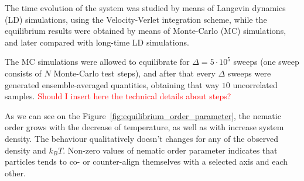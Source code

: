 \documentclass[12pt, a4paper]{article}
\newcommand{\figref}[1]{Figure~\ref{#1}}
\begin{document}
The time evolution of the system was studied by means of Langevin dynamics (LD) simulations, using the Velocity-Verlet integration scheme, while the equilibrium results were obtained by means of Monte-Carlo (MC) simulations, and later compared with long-time LD simulations.

The MC simulations were allowed to equilibrate for $\Delta = 5 \cdot 10^5$ sweeps (one sweep consists of $N$ Monte-Carlo test steps), and after that every $\Delta$ sweeps were generated ensemble-averaged quantities, obtaining that way $10$ uncorrelated samples. \textcolor{red}{Should I insert here the technical details about steps?}

As we can see on the \figref{fig:equilibrium_order_parameter}, the nematic order grows with the decrease of temperature, as well as with increase system density. The behaviour qualitatively doesn't changes for any of the observed density and $k_BT$. Non-zero values of nematic order parameter indicates that particles tends to co- or counter-align themselves with a selected axis and each other.
\end{document}
